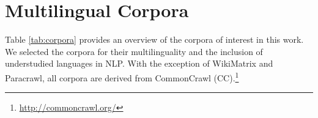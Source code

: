 



\section{Multilingual Corpora}\label{sec:crawls}
Table \ref{tab:corpora} provides an overview of the corpora of interest in this work. We selected the corpora for their multilinguality and the inclusion of understudied languages in NLP. With the exception of WikiMatrix and Paracrawl, all corpora are derived from CommonCrawl (CC).\footnote{\url{http://commoncrawl.org/}} %





